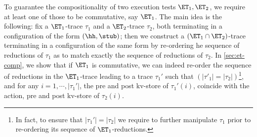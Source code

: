 To guarantee the compositionality of two execution tests $\ET_1, \ET_2$, we 
require at least one of those to be commutative, say $\ET_1$. The main idea 
is the following: fix a $\ET_1$-trace $\tau_1$ and a $\ET_2$-trace $\tau_2$, both terminating in a configuration 
of the form $(\hh, \stub)$; then we construct a $(\ET_1 \cap \ET_2)$-trace terminating 
in a configuration of the same form by re-ordering he sequence of 
reductions of $\tau_1$ as to match exactly the sequence of 
reductions of $\tau_2$. 
In \cref{sec:et-comp}, we show that if $\ET_1$ is commutative, 
we can indeed re-order the sequence of reductions in the 
$\ET_1$-trace leading to a trace $\tau_1'$ such that $(\lvert \tau'_1 \rvert = \lvert \tau_2 \rvert)$\footnote{In fact, 
to ensure that $\lvert \tau_1' \rvert = \lvert \tau_2 \rvert$ we require to further manipulate 
$\tau_1$ prior to re-ordering its sequence of $\ET_1$-reductions.}, 
and for any 
$i=1,\cdots, \lvert \tau_1'\rvert$, the pre and post kv-store of $\tau_1'(i)$,
 coincide with the action, pre and post kv-store 
of $\tau_2(i)$.

